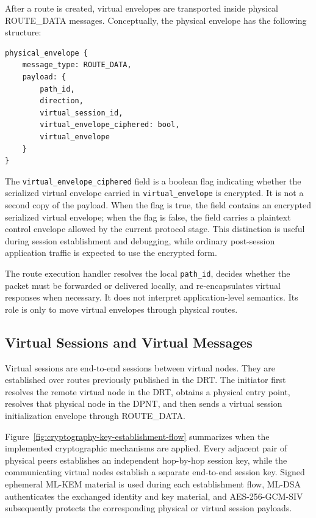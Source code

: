 \documentclass[12pt]{article}
\newcommand{\codebreak}[1]{{\footnotesize\ttfamily #1}}
\begin{document}
After a route is created, virtual envelopes are transported inside physical \codebreak{ROUTE\_\allowbreak{}DATA} messages. Conceptually, the physical envelope has the following structure:

\begin{verbatim}
physical_envelope {
    message_type: ROUTE_DATA,
    payload: {
        path_id,
        direction,
        virtual_session_id,
        virtual_envelope_ciphered: bool,
        virtual_envelope
    }
}
\end{verbatim}

The \texttt{virtual\_envelope\_ciphered} field is a boolean flag indicating whether the serialized virtual envelope carried in \texttt{virtual\_envelope} is encrypted. It is not a second copy of the payload. When the flag is true, the field contains an encrypted serialized virtual envelope; when the flag is false, the field carries a plaintext control envelope allowed by the current protocol stage. This distinction is useful during session establishment and debugging, while ordinary post-session application traffic is expected to use the encrypted form.

The route execution handler resolves the local \texttt{path\_id}, decides whether the packet must be forwarded or delivered locally, and re-encapsulates virtual responses when necessary. It does not interpret application-level semantics. Its role is only to move virtual envelopes through physical routes.

\subsection{Virtual Sessions and Virtual Messages}
\label{sec:virtual-sessions-messages}

Virtual sessions are end-to-end sessions between virtual nodes. They are established over routes previously published in the DRT. The initiator first resolves the remote virtual node in the DRT, obtains a physical entry point, resolves that physical node in the DPNT, and then sends a virtual session initialization envelope through \codebreak{ROUTE\_\allowbreak{}DATA}.

Figure~\ref{fig:cryptography-key-establishment-flow} summarizes when the implemented cryptographic mechanisms are applied. Every adjacent pair of physical peers establishes an independent hop-by-hop session key, while the communicating virtual nodes establish a separate end-to-end session key. Signed ephemeral ML-KEM material is used during each establishment flow, ML-DSA authenticates the exchanged identity and key material, and AES-256-GCM-SIV subsequently protects the corresponding physical or virtual session payloads.
\end{document}
